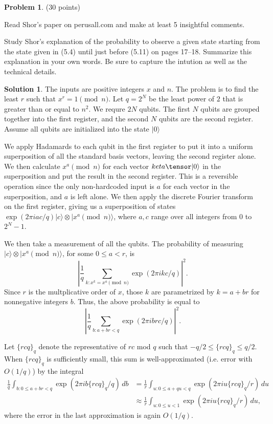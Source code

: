 \documentclass{article}
\theoremstyle{definition}
\newtheorem{problem}{Problem}
\newtheorem*{solution}{Solution}
\newcommand{\ket}[1]{|#1\rangle}
\begin{document}
\begin{problem} (30 points) 
\begin{compactenum}[(a)]
\item Read Shor's paper on perusall.com and make at least 5 insightful comments. 
\item Study Shor's explanation of the probability to observe a given state starting from the state given in (5.4) until just before (5.11) on pages 17--18. Summarize this explanation in your own words. Be sure to capture the intution as well as the technical details. 
\end{compactenum}
\end{problem}
\begin{solution}
The inputs are positive integers $x$ and $n$.  The problem is to find the least $r$ such that $x^r = 1 \pmod{n}$.  Let $q = 2^N$ be the least power of $2$ that is greater than or equal to $n^2$.  We requre $2N$ qubits.  The first $N$ qubits are grouped together into the first register, and the second $N$ qubits are the second register.  Assume all qubits are initialized into the state $\ket{0}$

We apply Hadamards to each qubit in the first register to put it into a uniform superposition of all the standard basis vectors, leaving the second register alone. We then calculate $x^a \pmod{n}$ for each vector $ket{a}\tensor \ket{0}$ in the superposition and put the result in the second register.  This is a reversible operation since the only non-hardcoded input is $a$ for each vector in the superposition, and $a$ is left alone. We then apply the discrete Fourier transform on the first register, giving us a superposition of states $\exp(2\pi i a c/q) \ket{c} \otimes \ket{x^a \pmod{n}}$, where $a,c$ range over all integers from $0$ to $2^N-1$.  

We then take a measurement of all the qubits.  The probability of measuring $\ket{c} \otimes \ket{x^a \pmod{n}}$, for some $0 \le a < r$, is
$$ \left| \frac{1}{q} \sum_{k: x^k = x^a \pmod{n}} \exp(2\pi i k c/q) \right|^2.$$ 
Since $r$ is the multplicative order of $x$, those $k$ are parametrized by $k = a + br$ for nonnegative integers $b$.  Thus, the above probability is equal to
$$ \left| \frac{1}{q} \sum_{b: a + br < q} \exp(2\pi i  b r c/q) \right|^2.$$ 

\newcommand{\rcq}{\{rcq\}_q}

Let $\rcq$ denote the representative of $rc$ mod $q$ such that $-q/2 \le \rcq \le q/2$.  When $\rcq$ is sufficiently small,
 this sum is well-approximated (i.e. error with $O(1/q)$) by the integral
\begin{align*}
\frac{1}{q} \int_{b:0 \le a + br < q}  \exp(2\pi i  b \rcq /q) \, db & = \frac{1}{r} \int_{u:0 \le a + qu < q}  \exp(2\pi i u \rcq /r) \, du \\
 & \approx \frac{1}{r} \int_{u:0 \le u < 1}  \exp(2\pi i  u \rcq /r) \, du,
\end{align*}
where the error in the last approximation is again $O(1/q)$.


\end{solution}
\end{document}
